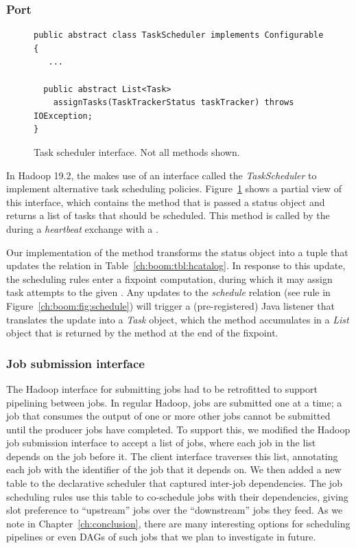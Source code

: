 \subsubsection{\JOL Port}
\begin{figure}
\ssp
\begin{minipage}{\linewidth}
\centering
\begin{verbatim}
public abstract class TaskScheduler implements Configurable {
   ...
   
  public abstract List<Task> 
  	assignTasks(TaskTrackerStatus taskTracker) throws IOException;
}
\end{verbatim}
\end{minipage}
\caption{Task scheduler interface. Not all methods shown.}
\label{ch:hop:fig:taskscheduler}
\end{figure}


In Hadoop 19.2, the \JT makes use of an interface called the {\em
TaskScheduler} to implement alternative task scheduling policies.
Figure~\ref{ch:hop:fig:taskscheduler} shows a partial view of this interface,
which contains the method  that is passed a \TT status object
and returns a list of tasks that should be scheduled.  This method is called by
the \JT during a {\em heartbeat} exchange with a \TT.

Our implementation of the  method transforms the \TT status
object into a tuple that updates the  relation in
Table~\ref{ch:boom:tbl:hcatalog}.  In response to this update, the scheduling
rules enter a fixpoint computation, during which it may assign task attempts to
the given \TT.  Any updates to the {\em schedule} relation (see rule  in
Figure~\ref{ch:boom:fig:schedule}) will trigger a (pre-registered) Java
listener that translates the update into a {\em Task} object, which the
 method accumulates in a {\em List} object that is returned by
the  method at the end of the fixpoint.

\subsubsection{Job submission interface}

The Hadoop {\JT} interface for submitting jobs had to be retrofitted to support
pipelining between jobs.  In regular Hadoop, jobs are submitted one at a time;
a job that consumes the output of one or more other jobs cannot be submitted
until the producer jobs have completed.  To support this, we modified the
Hadoop job submission interface to accept a list of jobs, where each job in the
list depends on the job before it.  The client interface traverses this list,
annotating each job with the identifier of the job that it depends on.  We then
added a new table to the declarative scheduler that captured inter-job
dependencies.  The job scheduling rules use this table to co-schedule jobs with
their dependencies, giving slot preference to ``upstream'' jobs over the
``downstream'' jobs they feed.  As we note in Chapter~\ref{ch:conclusion},
there are many interesting options for scheduling pipelines or even DAGs of
such jobs that we plan to investigate in future.


